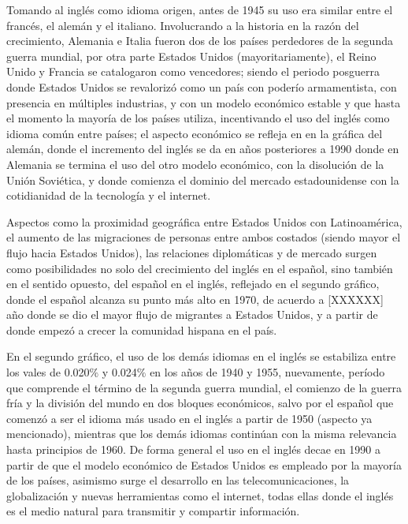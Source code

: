 Tomando al inglés como idioma origen, antes de 1945 su uso era similar entre el francés, el alemán y el italiano. Involucrando a la historia en la razón del crecimiento,  Alemania e Italia  fueron dos de los países perdedores de la segunda guerra mundial, por otra parte Estados Unidos (mayoritariamente), el Reino Unido y Francia se catalogaron como vencedores; siendo el periodo posguerra donde Estados Unidos se revalorizó como un país con poderío armamentista, con presencia en múltiples industrias, y con un modelo económico estable y que hasta el momento la mayoría de los países utiliza, incentivando el uso del inglés como idioma común entre países; el aspecto económico se refleja en en la gráfica del alemán, donde el incremento del inglés se da en años posteriores a 1990 donde en Alemania se termina el uso del otro modelo económico, con la disolución de la Unión Soviética, y donde comienza el dominio del mercado estadounidense con la cotidianidad de la tecnología y el internet. 

Aspectos como la proximidad geográfica entre Estados Unidos con Latinoamérica,  el aumento de las migraciones de personas entre ambos costados (siendo mayor el flujo hacia Estados Unidos),  las relaciones diplomáticas y de mercado surgen como posibilidades no solo del crecimiento del inglés en el español, sino también en el sentido opuesto, del español en el inglés, reflejado en el segundo gráfico, donde el español alcanza su punto más alto en 1970, de acuerdo a [XXXXXX] año donde se dio el mayor flujo de migrantes a Estados Unidos,  y a partir de donde empezó a crecer la comunidad hispana en el país. 


En el segundo gráfico,  el uso de los demás idiomas en el inglés se estabiliza entre los vales de  0.020$\%$ y 0.024$\%$  en los años de 1940 y 1955,  nuevamente, período que comprende el término de la segunda guerra mundial, el comienzo de la guerra fría y la división del mundo en dos bloques económicos,  salvo por el español que comenzó a ser el idioma más usado en el inglés a partir de 1950 (aspecto ya mencionado), mientras que los demás idiomas continúan con la misma relevancia  hasta principios de 1960.  De forma general el uso en el inglés decae en  1990 a partir de que el modelo económico de Estados Unidos es empleado por la mayoría de los países,  asimismo surge el desarrollo en las telecomunicaciones,  la globalización y nuevas herramientas como el internet, todas ellas donde el inglés es el medio natural para transmitir y compartir información. 


\newpage
